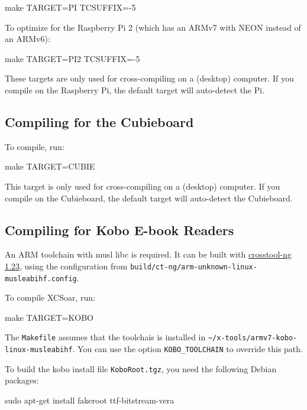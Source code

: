 \begin{verbatim*}
make TARGET=PI TCSUFFIX=-5
\end{verbatim*}

To optimize for the Raspberry Pi 2 (which has an ARMv7 with NEON
instead of an ARMv6):

\begin{verbatim*}
make TARGET=PI2 TCSUFFIX=-5
\end{verbatim*}

These targets are only used for cross-compiling on a (desktop)
computer.
If you compile on the Raspberry Pi, the default target will
auto-detect the Pi.

\subsection{Compiling for the Cubieboard}

To compile, run:

\begin{verbatim*}
make TARGET=CUBIE
\end{verbatim*}

This target is only used for cross-compiling on a (desktop) computer.
If you compile on the Cubieboard, the default target will auto-detect
the Cubieboard.

\subsection{Compiling for Kobo E-book Readers}

An ARM toolchain with musl libc is required. It can be built with
\href{http://crosstool-ng.github.io/}{crosstool-ng 1.23}, using the
configuration from \linebreak
\texttt{build/ct-ng/arm-unknown-linux-musleabihf.config}.

To compile XCSoar, run:

\begin{verbatim*}
make TARGET=KOBO
\end{verbatim*}

The \texttt{Makefile} assumes that the toolchais is installed in
\verb|~/x-tools/armv7-kobo-linux-musleabihf|.  You can use the option
\verb|KOBO_TOOLCHAIN| to override this path.

To build the kobo install file \texttt{KoboRoot.tgz}, you need the
following Debian packages:

\begin{verbatim*}
sudo apt-get install fakeroot ttf-bitstream-vera
\end{verbatim*}

